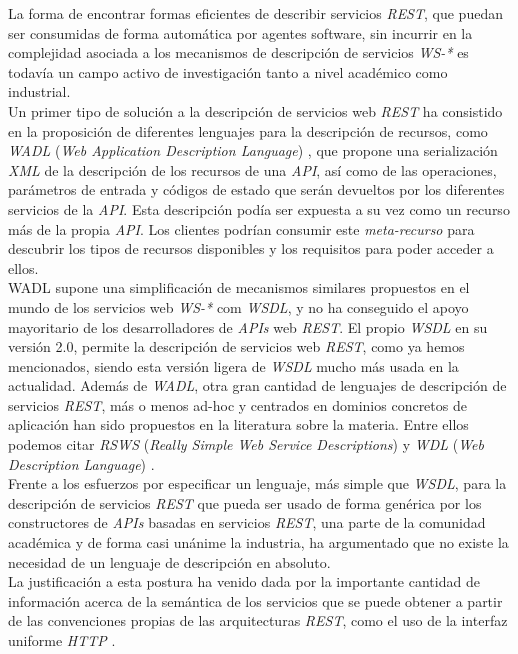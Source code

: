 La forma de encontrar formas eficientes de describir servicios \textit{REST}, que puedan ser consumidas de forma autom\'atica por agentes software, sin incurrir en la complejidad asociada a los mecanismos de  descripci\'on de servicios \textit{WS-*} es todav\'ia un campo activo de investigaci\'on tanto a nivel acad\'emico como industrial.\\
Un primer tipo de soluci\'on a la descripci\'on de servicios web \textit{REST} ha consistido en la proposici\'on de diferentes lenguajes para la descripci\'on de recursos, como \textit{WADL} (\textit{Web Application Description Language}) \cite{wadl}, que propone una serializaci\'on \textit{XML} de la descripci\'on de los recursos de una \textit{API}, as\'i como de las operaciones, par\'ametros de entrada y c\'odigos de estado que ser\'an devueltos por los diferentes servicios de la \textit{API}. Esta descripci\'on pod\'ia ser expuesta a su vez como un recurso m\'as de la propia \textit{API}. Los clientes podr\'ian consumir este \textit{meta-recurso} para descubrir los tipos de recursos disponibles y los requisitos para poder acceder a ellos.\\
WADL supone una simplificaci\'on de mecanismos similares propuestos en el mundo de los servicios web \textit{WS-*} com \textit{WSDL}, y no ha conseguido el apoyo mayoritario de los desarrolladores de \textit{APIs} web \textit{REST}. El propio \textit{WSDL} en su versi\'on 2.0, permite la descripci\'on de servicios web \textit{REST}, como ya hemos mencionados, siendo esta versi\'on ligera de \textit{WSDL} mucho m\'as usada en la actualidad. Adem\'as de \textit{WADL}, otra gran cantidad de lenguajes de descripci\'on de servicios \textit{REST}, m\'as o menos ad-hoc y centrados en dominios concretos de aplicaci\'on han sido propuestos en la literatura sobre la materia. Entre ellos podemos citar \textit{RSWS} (\textit{Really Simple Web Service Descriptions}) y \textit{WDL} (\textit{Web Description Language}) \cite{lanthaler2010towards}.\\
Frente a los esfuerzos por especificar un lenguaje, m\'as simple que \textit{WSDL}, para la descripci\'on de servicios \textit{REST} que pueda ser usado de forma gen\'erica por los constructores de \textit{APIs} basadas en servicios \textit{REST}, una parte de la comunidad acad\'emica y de forma casi un\'anime la industria, ha argumentado que no existe la necesidad de un lenguaje de descripci\'on en absoluto.\\
La justificaci\'on a esta postura ha venido dada por la importante cantidad de informaci\'on acerca de la sem\'antica de los servicios que se puede obtener a partir de las convenciones propias de las arquitecturas \textit{REST}, como el uso de la interfaz uniforme \textit{HTTP} \cite{lanthaler2010towards}.\\

